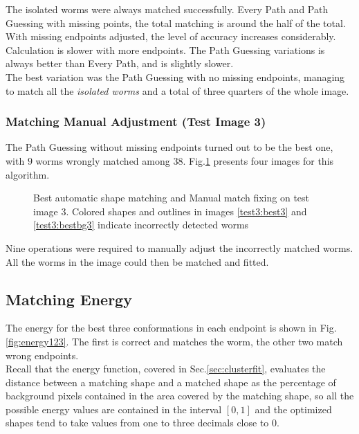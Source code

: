 The isolated worms were always matched successfully.
Every Path and Path Guessing with missing points, 
the total matching is around the half of the total. 
With missing endpoints adjusted, the level of accuracy increases considerably.
Calculation is slower with more endpoints.
The Path Guessing variations is always better than Every Path, and is slightly slower.\\
The best variation was the Path Guessing with no missing endpoints, managing
to match all the \emph{isolated worms} and a total of three quarters of the 
whole image.

\subsubsection*{Matching Manual Adjustment (Test Image 3)}

The Path Guessing without missing endpoints turned out to be the best one, with $9$ worms wrongly matched among $38$.
Fig.\ref{fig:best3} presents four images for this algorithm.

\begin{figure}[h!]
  \centering
\qquad
\qquad
  \label{best3:c}
\qquad
  \caption{Best automatic shape matching and Manual match fixing on test image 3. Colored shapes and outlines in images
    \ref{test3:best3} and \ref{test3:bestbg3} indicate incorrectly detected worms}
  \label{fig:best3}
\end{figure}


Nine operations were required to manually adjust the incorrectly matched worms.
All the worms in the image could then be matched and fitted.

\subsection{Matching Energy}

The energy for the best three conformations in each endpoint is shown in Fig.\ref{fig:energy123}.
The first is correct and matches the worm, the other two match wrong endpoints.\\
Recall that the energy function, covered
in Sec.\ref{sec:clusterfit}, evaluates the distance between a matching shape
and a matched shape as the percentage of background pixels contained in the 
area covered by the matching shape, so all the possible energy values are
contained in the interval $[0,1]$ and the optimized shapes tend to take values
from one to three decimals close to $0$.


